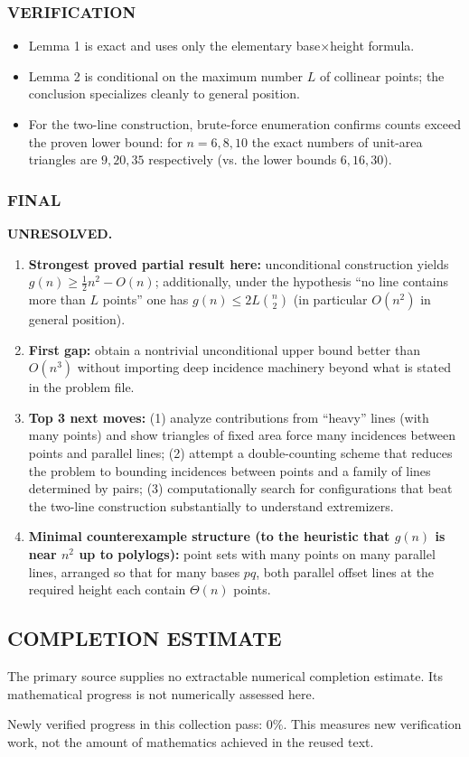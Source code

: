 \subsubsection*{VERIFICATION}
\begin{itemize}
\item Lemma 1 is exact and uses only the elementary base\(\times\)height formula.
\item Lemma 2 is conditional on the maximum number \(L\) of collinear points; the conclusion specializes cleanly to general position.
\item For the two-line construction, brute-force enumeration confirms counts exceed the proven lower bound:
for \(n=6,8,10\) the exact numbers of unit-area triangles are \(9,20,35\) respectively (vs. the lower bounds \(6,16,30\)).
\end{itemize}

\subsubsection*{FINAL}
\textbf{UNRESOLVED.}
\begin{enumerate}
\item[(i)] \textbf{Strongest proved partial result here:} unconditional construction yields \(g(n)\ge \frac12 n^2-O(n)\); additionally, under the hypothesis ``no line contains more than \(L\) points'' one has \(g(n)\le 2L\binom{n}{2}\) (in particular \(O(n^2)\) in general position).
\item[(ii)] \textbf{First gap:} obtain a nontrivial unconditional upper bound better than \(O(n^3)\) without importing deep incidence machinery beyond what is stated in the problem file.
\item[(iii)] \textbf{Top 3 next moves:}
(1) analyze contributions from ``heavy'' lines (with many points) and show triangles of fixed area force many incidences between points and parallel lines;
(2) attempt a double-counting scheme that reduces the problem to bounding incidences between points and a family of lines determined by pairs;
(3) computationally search for configurations that beat the two-line construction substantially to understand extremizers.
\item[(iv)] \textbf{Minimal counterexample structure (to the heuristic that \(g(n)\) is near \(n^2\) up to polylogs):}
point sets with many points on many parallel lines, arranged so that for many bases \(pq\), both parallel offset lines at the required height each contain \(\Theta(n)\) points.
\end{enumerate}




\subsection*{COMPLETION ESTIMATE}
The primary source supplies no extractable numerical completion estimate. Its mathematical progress is not numerically assessed here.

Newly verified progress in this collection pass: $0\%$. This measures new verification work, not the amount of mathematics achieved in the reused text.
